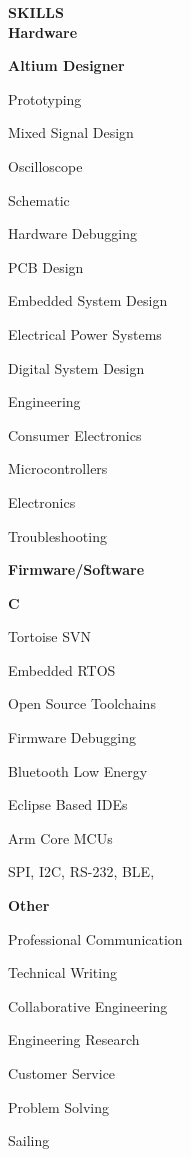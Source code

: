 \documentclass[10pt,letterpaper]{article}
\begin{document}
{\noindent\sc\bf SKILLS}\vspace{.5pc}\\ 
{\indent\indent\sc\bf Hardware}
 \begin{multicols}{3}
\begin{itemize}[leftmargin=0.75in, rightmargin=0.25in, topsep=0in, itemindent=0in, label=\textrm{--}]
 {\small\sl
\item {\bf Altium Designer}
\item Prototyping
\item Mixed Signal Design
\item Oscilloscope
\item Schematic
\item Hardware Debugging
\item PCB Design
\item Embedded System Design
\item Electrical Power Systems
\item Digital System Design
\item Engineering
\item Consumer Electronics
\item Microcontrollers
\item Electronics
\item Troubleshooting


}
\end{itemize}
\end{multicols}
{\indent\indent\sc\bf Firmware/Software}
 \begin{multicols}{3}
 \begin{itemize}[leftmargin=0.75in, rightmargin=0.25in, topsep=0mm,itemindent=0mm, label=\textrm{--}]
  {\small\sl
\item {\bf C }
\item Tortoise SVN
\item Embedded RTOS
\item Open Source Toolchains
\item Firmware Debugging
\item Bluetooth Low Energy
\item Eclipse Based IDEs
\item Arm Core MCUs
\item SPI, I2C, RS-232, BLE, 
}
\end{itemize}
\end{multicols}

{\indent\indent\sc\bf Other}
 \begin{multicols}{3}
 \begin{itemize}[leftmargin=0.75in, rightmargin=0.25in, topsep=0mm,itemindent=0mm, label=\textrm{--}]
  {\small\sl
  
\item Professional Communication
\item Technical Writing
\item Collaborative Engineering
\item Engineering Research
\item Customer Service
\item Problem Solving
\item Sailing

}
\end{itemize}
\end{multicols}
\end{document}
